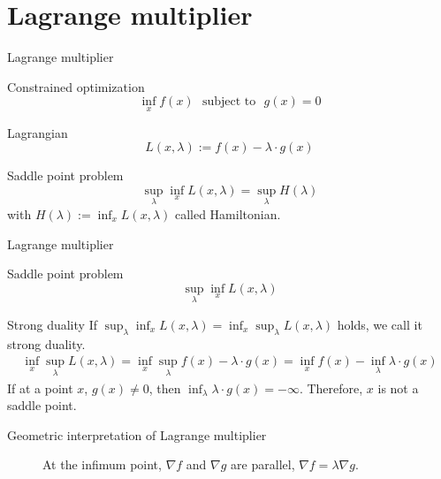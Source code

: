 \documentclass[color=usenames,dvipsnames]{beamer}
\begin{document}
\section{Lagrange multiplier}
\begin{frame}{Lagrange multiplier}
    \begin{block}
        {Constrained optimization}
        \[
        \inf_x f(x) ~~~ \textrm{subject to}~~~g(x)=0
        \]
    \end{block}
    \begin{block}
        {Lagrangian}
        \[
        L(x,\lambda):= f(x) - \lambda \cdot g(x)
        \]
    \end{block}
    \begin{block}
        {Saddle point problem}
        \[
        \sup_{\lambda}\inf_{x}L(x,\lambda)=\sup_{\lambda}H(\lambda)
        \]
        with $H(\lambda):=\inf_{x}L(x,\lambda)$ called Hamiltonian.
    \end{block}
\end{frame}
\begin{frame}{Lagrange multiplier}
    \begin{block}
        {Saddle point problem}
        \[
        \sup_{\lambda}\inf_{x}L(x,\lambda)
        \]
    \end{block}
        \begin{block}
        {Strong duality}
        If 
        $\sup_{\lambda}\inf_{x}L(x,\lambda) =\inf_{x}\sup_{\lambda}L(x,\lambda)$
        holds, we call it strong duality.
        \[
        \begin{split}
            \inf_{x}\sup_{\lambda}L(x,\lambda)= \inf_{x}\sup_{\lambda}f(x)-\lambda\cdot g(x)= \inf_{x}f(x)-\inf_{\lambda}\lambda \cdot g(x)
        \end{split}
        \]
        If at a point $x$, $g(x)\neq0$, then $\inf_{\lambda}\lambda \cdot g(x)=-\infty$. Therefore, $x$ is not a saddle point.
    \end{block}
\end{frame}
\begin{frame}{Geometric interpretation of Lagrange multiplier}
    \begin{figure}
        \centering
        
        \caption{At the infimum point, $\nabla f$ and $\nabla g$ are parallel, $\nabla f=\lambda\nabla g$.}
        \label{fig:Lagrange}
    \end{figure}
\end{frame}
\end{document}
